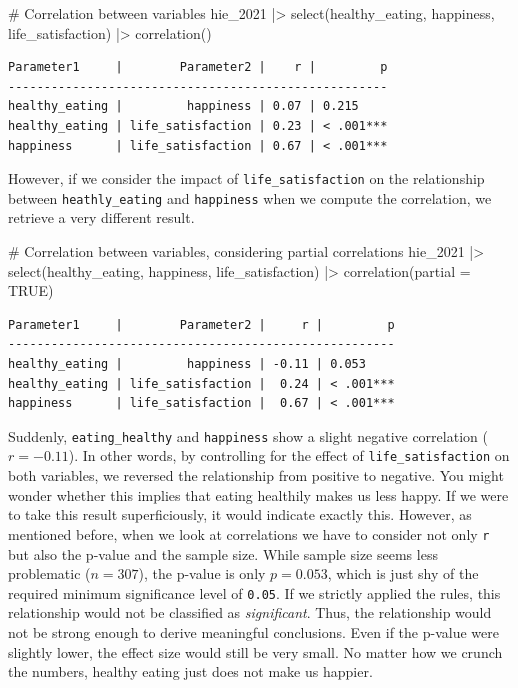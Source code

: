 \documentclass[
  letterpaper,
  DIV=11,
  numbers=noendperiod]{scrreprt}
\newenvironment{Shaded}{\begin{snugshade}}{\end{snugshade}}
\newcommand{\AttributeTok}[1]{\textcolor[rgb]{0.40,0.45,0.13}{#1}}
\newcommand{\CommentTok}[1]{\textcolor[rgb]{0.37,0.37,0.37}{#1}}
\newcommand{\ConstantTok}[1]{\textcolor[rgb]{0.56,0.35,0.01}{#1}}
\newcommand{\FunctionTok}[1]{\textcolor[rgb]{0.28,0.35,0.67}{#1}}
\newcommand{\NormalTok}[1]{\textcolor[rgb]{0.00,0.23,0.31}{#1}}
\newcommand{\SpecialCharTok}[1]{\textcolor[rgb]{0.37,0.37,0.37}{#1}}
\begin{document}
\begin{Shaded}
\begin{Highlighting}[]
\CommentTok{\# Correlation between variables}
\NormalTok{hie\_2021 }\SpecialCharTok{|\textgreater{}}
  \FunctionTok{select}\NormalTok{(healthy\_eating, happiness, life\_satisfaction) }\SpecialCharTok{|\textgreater{}}
  \FunctionTok{correlation}\NormalTok{()}
\end{Highlighting}
\end{Shaded}

\begin{verbatim}
Parameter1     |        Parameter2 |    r |         p
-----------------------------------------------------
healthy_eating |         happiness | 0.07 | 0.215    
healthy_eating | life_satisfaction | 0.23 | < .001***
happiness      | life_satisfaction | 0.67 | < .001***
\end{verbatim}

However, if we consider the impact of \texttt{life\_satisfaction} on the
relationship between \texttt{heathly\_eating} and \texttt{happiness}
when we compute the correlation, we retrieve a very different result.

\begin{Shaded}
\begin{Highlighting}[]
\CommentTok{\# Correlation between variables, considering partial correlations}
\NormalTok{hie\_2021 }\SpecialCharTok{|\textgreater{}}
  \FunctionTok{select}\NormalTok{(healthy\_eating, happiness, life\_satisfaction) }\SpecialCharTok{|\textgreater{}}
  \FunctionTok{correlation}\NormalTok{(}\AttributeTok{partial =} \ConstantTok{TRUE}\NormalTok{)}
\end{Highlighting}
\end{Shaded}

\begin{verbatim}
Parameter1     |        Parameter2 |     r |         p
------------------------------------------------------
healthy_eating |         happiness | -0.11 | 0.053    
healthy_eating | life_satisfaction |  0.24 | < .001***
happiness      | life_satisfaction |  0.67 | < .001***
\end{verbatim}

Suddenly, \texttt{eating\_healthy} and \texttt{happiness} show a slight
negative correlation (\(r = -0.11\)). In other words, by controlling for
the effect of \texttt{life\_satisfaction} on both variables, we reversed
the relationship from positive to negative. You might wonder whether
this implies that eating healthily makes us less happy. If we were to
take this result superficiously, it would indicate exactly this.
However, as mentioned before, when we look at correlations we have to
consider not only \texttt{r} but also the p-value and the sample size.
While sample size seems less problematic (\(n = 307\)), the p-value is
only \(p = 0.053\), which is just shy of the required minimum
significance level of \texttt{0.05}. If we strictly applied the rules,
this relationship would not be classified as \emph{significant}. Thus,
the relationship would not be strong enough to derive meaningful
conclusions. Even if the p-value were slightly lower, the effect size
would still be very small. No matter how we crunch the numbers, healthy
eating just does not make us happier.
\end{document}
